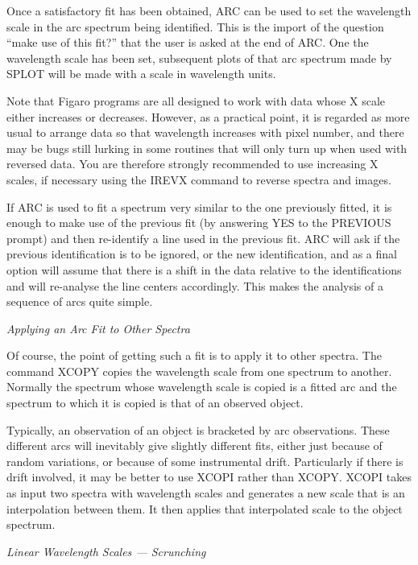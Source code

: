 Once a satisfactory fit has been obtained, ARC can be used to set the
wavelength scale in the arc spectrum being identified.  This is the import of
the question ``make use of this fit?'' that the user is asked at the end of 
ARC.  One the wavelength scale has been set, subsequent plots of that arc
spectrum made by SPLOT will be made with a scale in wavelength units.

Note that Figaro programs are all designed to work with data whose
X scale either increases or decreases.  However, as a practical point, it is
regarded as more usual to arrange data so that wavelength increases with 
pixel number, and there may be bugs still lurking in some routines that
will only turn up when used with reversed data.  
You are therefore strongly recommended
to use increasing X scales, if necessary using the IREVX command to
reverse spectra and images.

If ARC is used to fit a spectrum very similar to the one previously
fitted, it is enough to make use of the previous fit (by answering YES to
the PREVIOUS prompt) and then re-identify a line used in the previous
fit.  ARC will ask if the previous identification is to be ignored, or the
new identification, and as a final option will assume that there is a shift
in the data relative to the identifications and will re-analyse the
line centers accordingly.  This makes the analysis of a sequence of arcs
quite simple.


\goodbreak
\vspace{12pt}
{\it Applying an Arc Fit to Other Spectra}

Of course, the point of getting such a fit is to apply it to other
spectra.  The command XCOPY copies the wavelength scale from one spectrum
to another.  Normally the spectrum whose wavelength scale is copied is
a fitted arc and the spectrum to which it is copied is that of an 
observed object.

Typically, an observation of an object is bracketed by arc observations.
These different arcs will inevitably give slightly different fits, either
just because of random variations, or because of some instrumental drift.  
Particularly if there is drift involved, it may be better to use XCOPI rather
than XCOPY.  XCOPI takes as input two spectra with wavelength scales and
generates a new scale that is an interpolation between them.  It then applies
that interpolated scale to the object spectrum.


\goodbreak
\vspace{12pt}
{\it Linear Wavelength Scales --- Scrunching}


